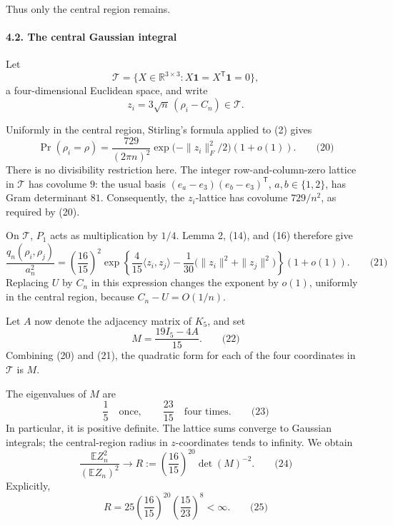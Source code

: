\documentclass[
  11pt,
  a4paper,
]{article}
\begin{document}
Thus only the central region remains.

\paragraph{4.2. The central Gaussian
integral}\label{the-central-gaussian-integral}

Let \[
\mathcal T=\{X\in\mathbb R^{3\times3}:
                  X\mathbf1=X^{\mathsf T}\mathbf1=0\},
\] a four-dimensional Euclidean space, and write \[
z_i=3\sqrt n\,(\rho_i-C_n)\in\mathcal T.
\]

Uniformly in the central region, Stirling's formula applied to (2) gives
\[
\Pr(\rho_i=\rho)
 =
 \frac{729}{(2\pi n)^2}
 \exp\bigl(-\|z_i\|_F^2/2\bigr)(1+o(1)).                        \qquad\text{(20)}
\] There is no divisibility restriction here. The integer
row-and-column-zero lattice in \(\mathcal T\) has covolume \(9\): the
usual basis \((e_a-e_3)(e_b-e_3)^{\mathsf T}\), \(a,b\in\{1,2\}\), has
Gram determinant \(81\). Consequently, the \(z_i\)-lattice has covolume
\(729/n^2\), as required by (20).

On \(\mathcal T\), \(P_1\) acts as multiplication by \(1/4\). Lemma 2,
(14), and (16) therefore give \[
\frac{q_n(\rho_i,\rho_j)}{a_n^2}
 =
 \left(\frac{16}{15}\right)^2
 \exp\left\{
 \frac4{15}\langle z_i,z_j\rangle
 -\frac1{30}\bigl(\|z_i\|^2+\|z_j\|^2\bigr)
 \right\}(1+o(1)).                                              \qquad\text{(21)}
\] Replacing \(U\) by \(C_n\) in this expression changes the exponent by
\(o(1)\), uniformly in the central region, because \(C_n-U=O(1/n)\).

Let \(A\) now denote the adjacency matrix of \(K_5\), and set \[
M=\frac{19I_5-4A}{15}.                                         \qquad\text{(22)}
\] Combining (20) and (21), the quadratic form for each of the four
coordinates in \(\mathcal T\) is \(M\).

The eigenvalues of \(M\) are \[
\frac15\quad\text{once},\qquad
\frac{23}{15}\quad\text{four times}.                            \qquad\text{(23)}
\] In particular, it is positive definite. The lattice sums converge to
Gaussian integrals; the central-region radius in \(z\)-coordinates tends
to infinity. We obtain \[
\frac{\mathbb E Z_n^2}{(\mathbb E Z_n)^2}
 \longrightarrow
 R:=\left(\frac{16}{15}\right)^{20}\det(M)^{-2}.                 \qquad\text{(24)}
\] Explicitly, \[
R=25\left(\frac{16}{15}\right)^{20}
       \left(\frac{15}{23}\right)^8<\infty.                     \qquad\text{(25)}
\]
\end{document}
